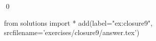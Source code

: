 
\begin{ex} 
  \label{ex:closure9}
  
  \qed
\end{ex} 
\begin{python0}
from solutions import *
add(label="ex:closure9",
    srcfilename='exercises/closure9/answer.tex') 
\end{python0}
